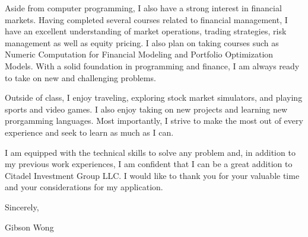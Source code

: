 \documentclass[letterpaper]{deedy-resume} %
\begin{document}
{\begin {flushleft}
Aside from computer programming, I also have a strong interest in financial markets. Having completed several courses related to financial management, I have an excellent understanding of market operations, trading strategies, risk management as well as equity pricing. I also plan on taking courses such as Numeric Computation for Financial Modeling and Portfolio Optimization Models. With a solid foundation in programming and finance, I am always ready to take on new and challenging problems.
\end {flushleft}


\begin {flushleft}
Outside of class, I enjoy traveling, exploring stock market simulators, and playing sports and video games. I also enjoy taking on new projects and learning new prorgamming languages. Most importantly, I strive to make the most out of every experience and seek to learn as much as I can. \\
\end {flushleft}

\begin {flushleft}
I am equipped with the technical skills to solve any problem and, in addition to my previous work experiences, I am confident that I can be a great addition to Citadel Investment Group LLC. I would like to thank you for your valuable time and your considerations for my application. \\
\end {flushleft}

\begin {flushleft}
Sincerely,\\
\end {flushleft}

\begin {flushleft}
Gibson Wong
\end {flushleft}
}
\endgroup


\newpage %
\restoregeometry
\fi


\end{document}

